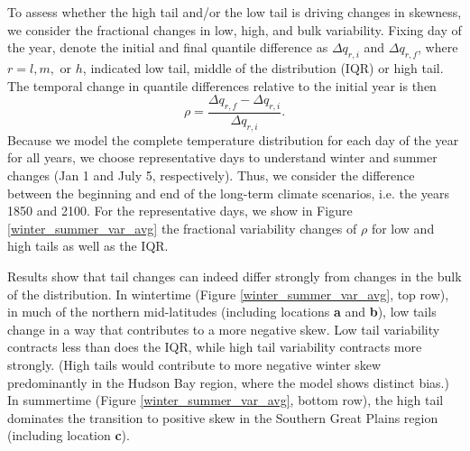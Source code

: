 \documentclass{ametsoc}
\begin{document}
To assess whether the high tail and/or the low tail is driving changes in skewness, we consider the fractional changes in low, high, and bulk variability.
{Fixing day of the year, denote the initial and final quantile difference as $\Delta q_{r, i}$ and $\Delta q_{r, f}$, where $r=l,m,$ or $h$, indicated low tail, middle of the distribution (IQR) or high tail. The temporal change in quantile differences relative to the initial year is then
\begin{equation}
	\rho = \frac{\Delta q_{r, f} - \Delta q_{r, i}}{\Delta q_{r, i}}.
\label{eq:relnorm}
\end{equation}
 Because we model the complete temperature distribution for each day of the year for all years, we choose representative days to understand winter and summer changes (Jan 1 and July 5, respectively). Thus, we consider the difference between the beginning and end of the long-term climate scenarios, i.e. the years 1850 and 2100. For the representative days, we show in Figure \ref{winter_summer_var_avg} the fractional variability changes of $\rho$ for low and high tails as well as the IQR. }

Results show that tail changes can indeed differ strongly from changes in the bulk of the distribution.  In wintertime (Figure \ref{winter_summer_var_avg}, top row), in much of the northern mid-latitudes (including locations \textbf{a} and \textbf{b}), low tails change in a way that contributes to a more negative skew. Low tail variability contracts less than does the IQR, while high tail variability contracts more strongly. (High tails would contribute to more negative winter skew predominantly in the Hudson Bay region, where the model shows distinct bias.) In summertime (Figure \ref{winter_summer_var_avg}, bottom row), the high tail dominates the transition to positive skew in the Southern Great Plains region (including location \textbf{c}).
\end{document}

